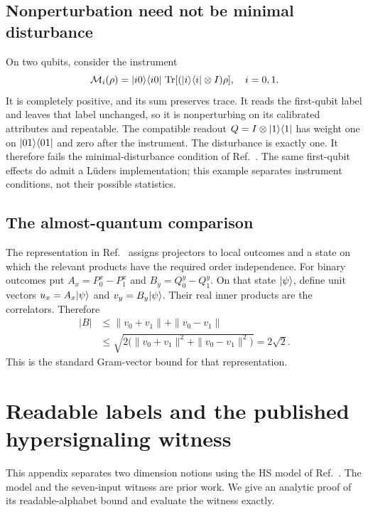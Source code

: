 \subsection{Nonperturbation need not be minimal disturbance}
On two qubits, consider the instrument
\begin{equation}\label{eq:reset}
 \mathcal M_i(\rho)=\ket{i0}\bra{i0}\,
 \Tr[(\ket i\bra i\otimes I)\rho],\quad i=0,1.
\end{equation}
It is completely positive, and its sum preserves trace. It reads the first-qubit label and leaves that label unchanged, so it is nonperturbing on its calibrated attributes and repeatable. The compatible readout $Q=I\otimes\lvert 1\rangle\langle 1\rvert$ has weight one on $\lvert 01\rangle\langle 01\rvert$ and zero after the instrument. The disturbance is exactly one. It therefore fails the minimal-disturbance condition of Ref.~\cite[Eq.~(4)]{sharp}. The same first-qubit effects do admit a L\"uders implementation; this example separates instrument conditions, not their possible statistics.

\subsection{The almost-quantum comparison}
The representation in Ref.~\cite[Definition 1 and Sec.~6]{aq} assigns projectors to local outcomes and a state on which the relevant products have the required order independence. For binary outcomes put $A_x=P_0^x-P_1^x$ and $B_y=Q_0^y-Q_1^y$. On that state $\lvert \psi\rangle$, define unit vectors $u_x=A_x\lvert \psi\rangle$ and $v_y=B_y\lvert \psi\rangle$. Their real inner products are the correlators. Therefore
\begin{equation}\label{eq:gram-bound}
\begin{aligned}
 |B|&\leq\|v_0+v_1\|+\|v_0-v_1\|\\
 &\leq\sqrt{2\bigl(\|v_0+v_1\|^2+\|v_0-v_1\|^2\bigr)}
 =2\sqrt2.
\end{aligned}
\end{equation}
This is the standard Gram-vector bound for that representation.

\section{Readable labels and the published hypersignaling witness}\label{app:hs}
This appendix separates two dimension notions using the HS model of Ref.~\cite[Eq.~(4) and Supplemental Material]{hs}. The model and the seven-input witness are prior work. We give an analytic proof of its readable-alphabet bound and evaluate the witness exactly.

